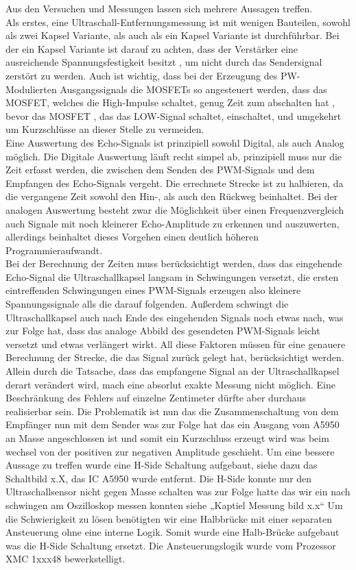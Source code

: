 Aus den Versuchen und Messungen lassen sich mehrere Aussagen treffen. \\
Als erstes, eine Ultraschall-Entfernungsmessung ist mit wenigen Bauteilen, sowohl als zwei Kapsel Variante, als auch als ein Kapsel Variante ist durchführbar. Bei der ein Kapsel Variante ist darauf zu achten, dass der Verstärker eine ausreichende Spannungsfestigkeit besitzt , um nicht durch das Sendersignal zerstört zu werden. Auch ist wichtig, dass bei der Erzeugung des PW-Modulierten Ausgangssignals die MOSFETs so angesteuert werden, dass das MOSFET, welches die High-Impulse schaltet, genug Zeit zum abschalten hat , bevor das MOSFET , das das LOW-Signal schaltet, einschaltet, und umgekehrt um Kurzschlüsse an dieser Stelle zu vermeiden.\\
Eine Auswertung des Echo-Signals ist prinzipiell sowohl Digital, als auch Analog möglich. Die Digitale Auswertung läuft recht simpel ab, prinzipiell muss nur die Zeit erfasst werden, die zwischen dem Senden des PWM-Signals und dem Empfangen des Echo-Signals vergeht. Die errechnete Strecke ist zu halbieren, da die vergangene Zeit sowohl den Hin-, als auch den Rückweg beinhaltet. Bei der analogen Auswertung besteht zwar die Möglichkeit über einen Frequenzvergleich auch Signale mit noch kleinerer Echo-Amplitude zu erkennen und auszuwerten, allerdings beinhaltet dieses Vorgehen einen deutlich höheren Programmieraufwandt.\\
Bei der Berechnung der Zeiten muss berücksichtigt werden, dass das eingehende Echo-Signal die Ultraschallkapsel langsam in Schwingungen versetzt, die ersten eintreffenden Schwingungen eines PWM-Signals erzeugen also kleinere Spannungssignale alls die darauf folgenden. Außerdem schwingt die Ultraschallkapsel auch nach Ende des eingehenden Signals noch etwas nach, was zur Folge hat, dass das analoge Abbild des gesendeten PWM-Signals leicht versetzt und etwas verlängert wirkt. All diese Faktoren müssen für eine genauere Berechnung der Strecke, die das Signal zurück gelegt hat, berücksichtigt werden. Allein durch die Tatsache, dass das empfangene Signal an der Ultraschallkapsel derart verändert wird, mach eine absorlut exakte Messung nicht möglich. Eine Beschränkung des Fehlers auf einzelne Zentimeter dürfte aber durchaus realisierbar sein.
Die Problematik ist nun das die Zusammenschaltung von dem Empfänger nun mit dem Sender was zur Folge hat das ein Ausgang vom A5950 an Masse angeschlossen ist und somit ein Kurzschluss erzeugt wird was beim wechsel von der positiven zur negativen Amplitude geschieht.
Um eine bessere Aussage zu treffen wurde eine H-Side Schaltung aufgebaut, siehe dazu das Schaltbild x.X, das IC A5950 wurde entfernt. Die H-Side konnte nur den Ultraschallsensor nicht gegen Masse schalten was zur Folge hatte das wir ein nach schwingen am Oszilloskop messen konnten siehe „Kaptiel Messung bild x.x“ 
Um die Schwierigkeit zu lösen benötigten wir eine Halbbrücke mit einer separaten Ansteuerung ohne eine interne Logik. Somit wurde eine Halb-Brücke aufgebaut was die H-Side Schaltung ersetzt. Die Ansteuerungslogik wurde vom Prozessor XMC 1xxx48 bewerkstelligt. 
